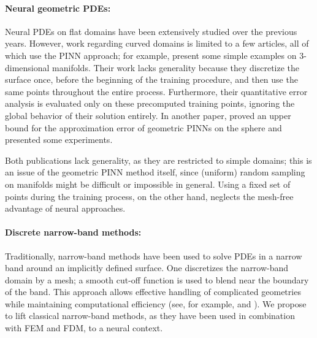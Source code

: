 \documentclass[12pt,openany]{book}
\theoremstyle{plainnormal}
\theoremstyle{remark}
\begin{document}
\paragraph{Neural geometric PDEs:}
Neural PDEs on flat domains have been extensively studied over the previous years. However, work regarding curved domains is limited to a few articles, all of which use the PINN approach; for example, \cite{tangfu} present some simple examples on 3-dimensional manifolds. Their work lacks generality because they discretize the surface once, before the beginning of the training procedure, and then use the same points throughout the  entire process. Furthermore, their quantitative error analysis is evaluated only on these precomputed training points, ignoring the global behavior of their solution entirely. In another paper, \cite{lei2024solvingpdesspheresphysicsinformed} proved an upper bound for the approximation error of geometric PINNs on the sphere and presented some experiments.\par
Both publications lack generality, as they are restricted to simple domains; this is an issue of the geometric PINN method itself, since (uniform) random sampling on manifolds might be difficult or impossible in general. Using a fixed set of points during the training process, on the other hand, neglects the mesh-free advantage of neural approaches. 
\paragraph{Discrete narrow-band methods:}
Traditionally, narrow-band methods have been used to solve PDEs in a narrow band around an implicitly defined surface. One discretizes the narrow-band domain by a mesh; a smooth cut-off function is used to blend near the boundary of the band. This approach allows effective handling of complicated geometries while maintaining computational efficiency (see, for example, \cite{deckelnick} and \cite{neRU}). We propose to lift classical narrow-band methods, as they have been used in combination with FEM and FDM, to a neural context. 
\end{document}
